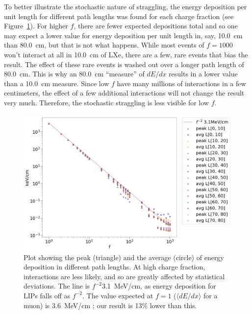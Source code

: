 To better illustrate the stochastic nature of straggling, the energy deposition per unit length for different path lengths was found for each charge fraction (see Figure~\ref{fig:stochastic}). For higher $f$, there are fewer expected depositions total and so one may expect a lower value for energy deposition per unit length in, say, 10.0~cm than 80.0~cm, but that is not what happens. While most events of $f=1000$ won't interact at all in 10.0~cm of \ac{LXe}, there are a few, rare events that bias the result. The effect of these rare events is washed out over a longer path length of 80.0~cm. This is why an 80.0~cm ``measure'' of $dE/dx$ results in a lower value than a 10.0~cm measure. Since low $f$ have many millions of interactions in a few centimeters, the effect of a few additional interactions will not change the result very much. Therefore, the stochastic straggling is less visible for low $f$.

 \begin{figure}[htbp]
\begin{center}
\includegraphics[width=\textwidth]{figures/lips/stochastic.png}
\caption{Plot showing the peak (triangle) and the average (circle) of energy deposition in different path lengths. At high charge fraction, interactions are less likely, and so are greatly affected by statistical deviations. The line is $f^{-2}$3.1~MeV/cm, as energy deposition for \acs{LIP}s falls off as $f^{-2}$. The value expected at $f=1$ ($\langle dE/dx \rangle$ for a muon) is 3.6~MeV/cm \cite{PDG}; our result is 13\% lower than this.  }
\label{fig:stochastic}
\end{center}
\end{figure}

 
